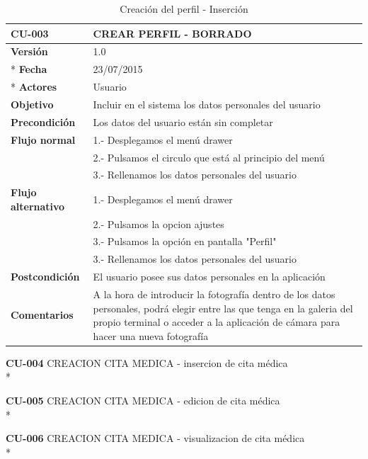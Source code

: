 \documentclass[../pfc.tex]{subfiles}
\begin{document}
	\begin{table}[!hbt]
		\centering
		\begin{tabular}[t]{|p{3cm}|p{9.5cm}|}
			\hline \textbf{CU-003} & \textbf{CREAR PERFIL - BORRADO} \\*
			\hline\hline \textbf{Versión} & 1.0 \\ *
			\hline\hline \textbf{Fecha} & 23/07/2015 \\ *
			\hline\textbf{Actores} 	& Usuario\\*
			\hline \textbf{Objetivo} & Incluir en el sistema los datos personales del usuario\\* 			
			\hline \textbf{Precondición} & Los datos del usuario están sin completar \\* 
			\hline \textbf{Flujo normal} & 1.- Desplegamos el menú drawer \\* 
			& 2.- Pulsamos el circulo que está al principio del menú \\*	
			& 3.- Rellenamos los datos personales del usuario\\*	
			\hline \textbf{Flujo alternativo} & 1.- Desplegamos el menú drawer \\* 
			& 2.- Pulsamos la opcion ajustes \\*	
			& 3.- Pulsamos la opción en pantalla "Perfil" \\*	
			& 3.- Rellenamos los datos personales del usuario \\*	
			\hline \textbf{Postcondición} & El usuario posee sus datos personales en la aplicación \\* 
			\hline \textbf{Comentarios}   & A la hora de introducir la fotografía dentro de los datos personales, podrá elegir entre las que tenga en la galeria del propio terminal o acceder a la aplicación de cámara para hacer una nueva fotografía\\*
			\hline
		\end{tabular}
		\caption{Creación del perfil - Inserción}
		\label{tabla:caso003}
	\end{table}
	
	
	
	
	
	
	
	\textbf{CU-004}	CREACION CITA MEDICA - insercion de cita médica\\*
	
	\textbf{CU-005}	CREACION CITA MEDICA - edicion de cita médica\\*
	
	\textbf{CU-006}	CREACION CITA MEDICA - visualizacion de cita médica\\*
	
\end{document}
